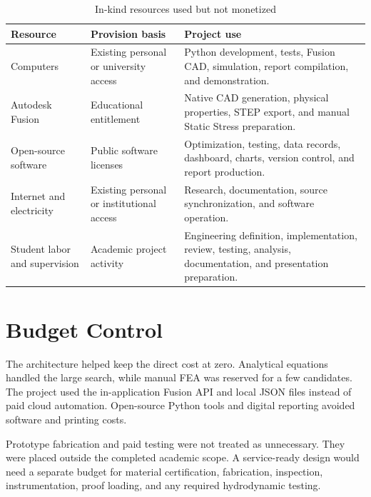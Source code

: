 \begin{table}[H]
\centering
\caption{In-kind resources used but not monetized}
\label{tab:in-kind}
\small
\begin{tabularx}{\textwidth}{
    >{\raggedright\arraybackslash}p{}
    >{\raggedright\arraybackslash}X
    >{\raggedright\arraybackslash}X}
\toprule
\textbf{Resource} & \textbf{Provision basis} & \textbf{Project use}\\
\midrule
Computers & Existing personal or university access &
Python development, tests, Fusion CAD, simulation, report compilation, and
demonstration.\\

Autodesk Fusion & Educational entitlement &
Native CAD generation, physical properties, STEP export, and manual Static
Stress preparation.\\

Open-source software & Public software licenses &
Optimization, testing, data records, dashboard, charts, version control, and
report production.\\

Internet and electricity & Existing personal or institutional access &
Research, documentation, source synchronization, and software operation.\\

Student labor and supervision & Academic project activity &
Engineering definition, implementation, review, testing, analysis,
documentation, and presentation preparation.\\
\bottomrule
\end{tabularx}
\end{table}

\section{Budget Control}
\label{sec:budget-control}

The architecture helped keep the direct cost at zero. Analytical equations
handled the large search, while manual FEA was reserved for a few candidates.
The project used the in-application Fusion API and local JSON files instead of
paid cloud automation. Open-source Python tools and digital reporting avoided
software and printing costs.

Prototype fabrication and paid testing were not treated as unnecessary. They
were placed outside the completed academic scope. A service-ready design would
need a separate budget for material certification, fabrication, inspection,
instrumentation, proof loading, and any required hydrodynamic testing.

